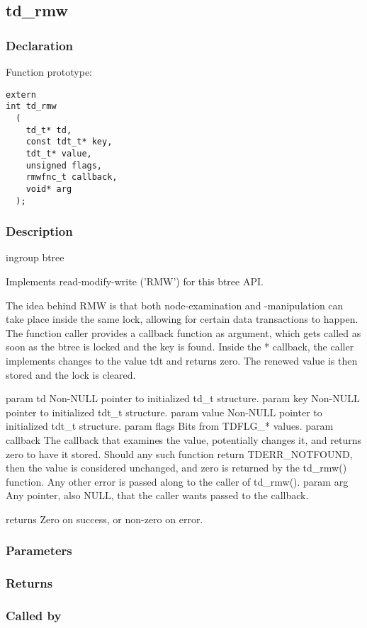 
\newpage
\subsection{td\_rmw}
\subsubsection{Declaration} Function prototype:

\begin{verbatim}
extern
int td_rmw
  (
    td_t* td,
    const tdt_t* key,
    tdt_t* value,
    unsigned flags,
    rmwfnc_t callback,
    void* arg
  );
\end{verbatim}

\subsubsection{Description}


 ingroup btree

 Implements read-modify-write ('RMW') for this btree API.

 The idea behind RMW is that both node-examination and -manipulation
 can take place inside the same lock, allowing for certain data
 transactions to happen.
 The function caller provides a callback function as argument,
 which gets called as soon as the btree is locked and the key is found.
 Inside the * callback, the caller implements changes to the value tdt
 and returns zero. The renewed value is then stored and the lock
 is cleared.

 param td Non-NULL pointer to initialized td\_t structure.
 param key Non-NULL pointer to initialized tdt\_t structure.
 param value Non-NULL pointer to initialized tdt\_t structure.
 param flags Bits from TDFLG\_* values.
 param callback The callback that examines the value, potentially
 changes it, and returns zero to have it stored. Should any such function
 return TDERR\_NOTFOUND, then the value is considered unchanged, and
 zero is returned by the td\_rmw() function. Any other error is passed
 along to the caller of td\_rmw().
 param arg Any pointer, also NULL, that the caller wants passed to
 the callback.

 returns Zero on success, or non-zero on error.
 

\subsubsection{Parameters}
\subsubsection{Returns}
\subsubsection{Called by}
